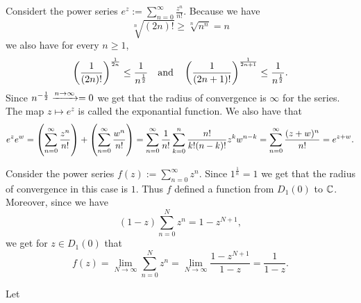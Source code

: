 \documentclass[11pt,a4paper]{article}
\begin{document}
\begin{example}
  Considert the power series $e^z := \sum_{n=0}^{\infty} \frac{z^n}{n!}$.
  Because we have
  \[
    \sqrt[n]{(2n)!} \geq \sqrt[n]{n^n} = n
  \]
  we also have for every $n \geq 1$,
  \[
    \del{\frac{1}{(2n)!}}^{\frac{1}{2n}} \le \frac{1}{n^{\half}}
    \tand
    \del{\frac{1}{(2n+1)!}}^{\frac{1}{2n+1}} \le \frac{1}{n^{\half}}.
  \]
  Since $n^{-\frac{1}{2}} \xrightarrow{n \to \infty} = 0$ we get that the radius of
  convergence is $\infty$ for the series.
  The map $z \mapsto e^z$ is called the exponantial function.
  We also have that
  \begin{align*}
    e^z e^w =
    \del{\sum_{n=0}^{\infty} \frac{z^n}{n!}} +
    \del{\sum_{n=0}^{\infty} \frac{w^n}{n!}} =
    \sum_{n=0}^{\infty}
    \frac{1}{n!} \sum_{k=0}^{n} \frac{n!}{k!(n-k)!} z^k w^{n-k} =
    \sum_{n=0}^{\infty} \frac{(z+w)^n}{n!} =
    e^{z + w}.
  \end{align*}
\end{example}

\begin{example}
  Consider the power series $f(z) := \sum_{n=0}^{\infty} z^n$.
  Since $1^{\frac 1n} = 1$ we get that the radius of convergence in
  this case is $1$.
  Thus $f$ defined a function from $D_1(0)$ to $\mathbb{C}$.
  Moreover, since we have
  \[
    (1 - z) \sum_{n=0}^{N} z^n = 1 - z^{N + 1},
  \]
  we get for $z \in D_1(0)$ that
  \[
    f(z) =
    \lim_{N \to \infty} \sum_{n=0}^{N} z^n =
    \lim_{N \to \infty} \frac{1 - z^{N + 1}}{1 - z} =
    \frac{1}{1 - z}.
  \]
\end{example}

\begin{proposition}
  Let 
\end{proposition}
\end{document}
